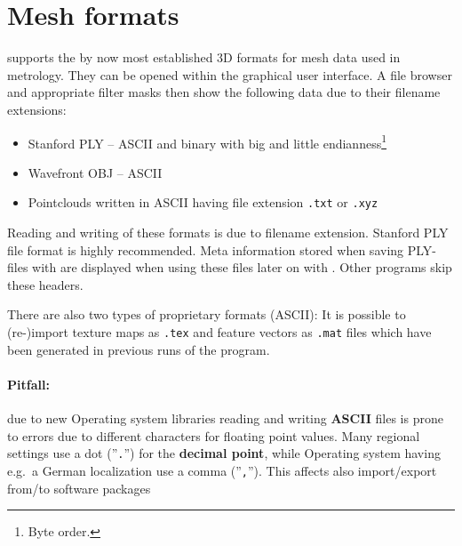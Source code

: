 \section{Mesh formats}
\GigaMesh supports the by now most established 3D formats for mesh data used in metrology. 
They can be opened within the graphical user interface. 
A file browser and appropriate filter masks then show the following data due to their filename extensions:
\begin{itemize}
	\item Stanford PLY -- ASCII and binary with big and little endianness\footnote{Byte order.}
	\item Wavefront OBJ -- ASCII 
	\item Pointclouds written in ASCII having file extension {\tt *.txt} or {\tt *.xyz}
\end{itemize}

Reading and writing of these formats is due to filename extension. 
Stanford PLY file format is highly recommended. 
Meta information stored when saving PLY-files with \GigaMesh are displayed when using these files later on with \GigaMesh. 
Other programs skip these headers.

There are also two types of proprietary formats (ASCII): 
It is possible to (re-)import texture maps as {\tt *.tex} and feature vectors as {\tt *.mat} files which have been generated in previous runs of the program.

\paragraph{Pitfall:} due to new Operating system libraries reading and writing {\bf ASCII} files is prone to errors
due to different characters for floating point values.
Many regional settings use a dot (''{\tt .}'') for the {\bf decimal point}, 
while Operating system having e.g.~a German localization use a comma (''{\tt ,}'').
This affects also import/export from/to software packages\!
